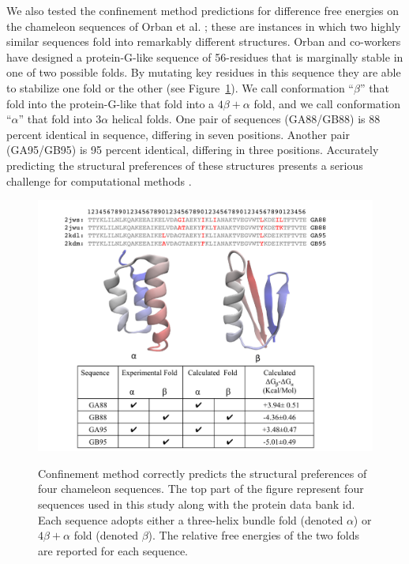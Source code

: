 \documentclass[12pt]{article}
\begin{document}
We also tested the confinement method predictions for difference free energies on the chameleon sequences of Orban 
et al. \cite{Alexander2007,He2008,Alexander2009,Bryan2010,He2012,Shortle2009}; these 
are instances in which two highly similar sequences fold into remarkably different structures. Orban and co-workers have designed a 
protein-G-like sequence of 56-residues that
is marginally stable in one of two possible folds. By mutating key residues in this sequence they
are able to stabilize one fold or the other (see Figure~\ref{fig:orban}). We call conformation ``$\beta$'' that fold into 
the protein-G-like that fold into a $4 \beta + \alpha$ fold, and we call conformation ``$\alpha$'' that fold into $3 \alpha$ helical folds.  One pair 
of sequences (GA88/GB88) is 88 percent identical in sequence, differing in seven positions. Another pair (GA95/GB95) is 95 percent identical, 
differing in three positions. 
Accurately predicting the 
structural preferences of these structures presents a serious challenge for computational methods 
\cite{Alexander2007,He2008,Alexander2009,Bryan2010,He2012,Shortle2009}.

\begin{figure}
\includegraphics[width=5.0in]{orban.pdf}
\label{fig:orban}
\caption{Confinement method correctly predicts the structural preferences of four chameleon
sequences. The top part of the figure represent four sequences used in this study along with the
protein data bank id. Each sequence adopts either a three-helix bundle fold (denoted $\alpha$) or
$4 \beta + \alpha$ fold (denoted $\beta$). The relative free energies of
the two folds are reported for each sequence.}
\end{figure}
\end{document}
